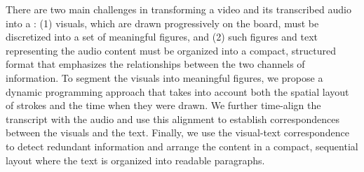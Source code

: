 There are two main challenges in transforming a video and its transcribed audio into a \systemname : (1) visuals, which are drawn progressively on the board, must be discretized into  a set of meaningful figures, and (2) such figures and text representing the audio content must be organized into a compact, structured format that emphasizes the relationships between the two channels of information.
%
To segment the visuals into meaningful figures, we propose a dynamic programming approach that takes into account both the spatial layout of strokes and the time when they were drawn. We further time-align the transcript with the audio and use this alignment to establish correspondences between the visuals and the text. Finally, we use the visual-text correspondence to detect redundant information and arrange the content in a compact, sequential layout where the text is organized into readable paragraphs.\\

